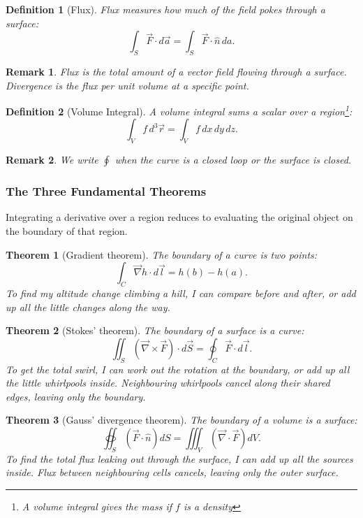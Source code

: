 \documentclass{article}
\newtheorem{theorem}{Theorem}
\newtheorem{definition}{Definition}
\newtheorem{remark}{Remark}
\begin{document}
\begin{definition}[Flux]
    Flux measures how much of the field pokes through a surface:
    \[\int_S \vec{F}\cdot d\vec{a} = \int_S \vec{F}\cdot\hat{n}\,da.\]
\end{definition}
\begin{remark}
    Flux is the total amount of a vector field flowing through a surface. Divergence is the flux per unit volume at a specific point.
\end{remark}
\begin{definition}[Volume Integral]
    A volume integral sums a scalar over a region\footnote{A volume integral gives the mass if $f$ is a density}:
    \[\int_V f\,d^3\vec{r} = \int_V f\,dx\,dy\,dz.\]
\end{definition}
\begin{remark}
    We write $\oint$ when the curve is a closed loop or the surface is closed.
\end{remark}

\subsubsection{The Three Fundamental Theorems}
Integrating a derivative over a region reduces to evaluating the original object on the boundary of that region.
\begin{theorem}[Gradient theorem]
    The boundary of a curve is two points:
    \[\int_C \vec{\nabla}h\cdot d\vec{l} = h(b) - h(a).\]
    To find my altitude change climbing a hill, I can compare before and after, or add up all the little changes along the way.
\end{theorem}
\begin{theorem}[Stokes' theorem]
    The boundary of a surface is a curve:
    \begin{equation}
        \iint_S (\vec{\nabla}\times\vec{F})\cdot d\vec{S} = \oint_C \vec{F}\cdot d\vec{l}.
    \end{equation}
    To get the total swirl, I can work out the rotation at the boundary, or add up all the little whirlpools inside. Neighbouring whirlpools cancel along their shared edges, leaving only the boundary.
\end{theorem}
\begin{theorem}[Gauss' divergence theorem]
    \label{Gauss-div}
    The boundary of a volume is a surface:
    \begin{equation}
        \oiint_S (\vec{F}\cdot\hat{n})dS = \iiint_V(\vec{\nabla}\cdot\vec{F})dV.
    \end{equation}
    To find the total flux leaking out through the surface, I can add up all the sources inside. Flux between neighbouring cells cancels, leaving only the outer surface.
\end{theorem}
\end{document}
